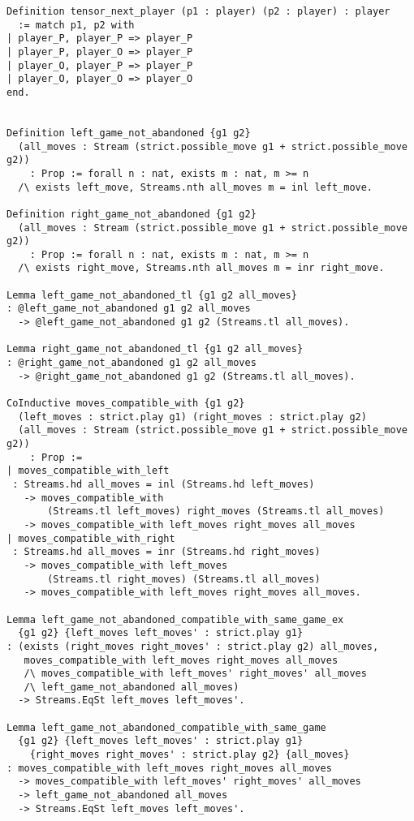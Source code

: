\documentclass{article}
\theoremstyle{definition}
\begin{document}
\begin{verbatim}
Definition tensor_next_player (p1 : player) (p2 : player) : player 
  := match p1, p2 with
| player_P, player_P => player_P
| player_P, player_O => player_P
| player_O, player_P => player_P
| player_O, player_O => player_O
end.

 
Definition left_game_not_abandoned {g1 g2}
  (all_moves : Stream (strict.possible_move g1 + strict.possible_move g2)) 
    : Prop := forall n : nat, exists m : nat, m >= n 
  /\ exists left_move, Streams.nth all_moves m = inl left_move. 

Definition right_game_not_abandoned {g1 g2} 
  (all_moves : Stream (strict.possible_move g1 + strict.possible_move g2)) 
    : Prop := forall n : nat, exists m : nat, m >= n 
  /\ exists right_move, Streams.nth all_moves m = inr right_move. 

Lemma left_game_not_abandoned_tl {g1 g2 all_moves}
: @left_game_not_abandoned g1 g2 all_moves
  -> @left_game_not_abandoned g1 g2 (Streams.tl all_moves).
  
Lemma right_game_not_abandoned_tl {g1 g2 all_moves}
: @right_game_not_abandoned g1 g2 all_moves 
  -> @right_game_not_abandoned g1 g2 (Streams.tl all_moves).

CoInductive moves_compatible_with {g1 g2}
  (left_moves : strict.play g1) (right_moves : strict.play g2) 
  (all_moves : Stream (strict.possible_move g1 + strict.possible_move g2))
    : Prop :=
| moves_compatible_with_left
 : Streams.hd all_moves = inl (Streams.hd left_moves)
   -> moves_compatible_with 
       (Streams.tl left_moves) right_moves (Streams.tl all_moves)
   -> moves_compatible_with left_moves right_moves all_moves
| moves_compatible_with_right
 : Streams.hd all_moves = inr (Streams.hd right_moves)
   -> moves_compatible_with left_moves
       (Streams.tl right_moves) (Streams.tl all_moves)
   -> moves_compatible_with left_moves right_moves all_moves.

Lemma left_game_not_abandoned_compatible_with_same_game_ex
  {g1 g2} {left_moves left_moves' : strict.play g1}
: (exists (right_moves right_moves' : strict.play g2) all_moves,
   moves_compatible_with left_moves right_moves all_moves
   /\ moves_compatible_with left_moves' right_moves' all_moves
   /\ left_game_not_abandoned all_moves)
  -> Streams.EqSt left_moves left_moves'.
  
Lemma left_game_not_abandoned_compatible_with_same_game
  {g1 g2} {left_moves left_moves' : strict.play g1} 
    {right_moves right_moves' : strict.play g2} {all_moves}
: moves_compatible_with left_moves right_moves all_moves
  -> moves_compatible_with left_moves' right_moves' all_moves
  -> left_game_not_abandoned all_moves
  -> Streams.EqSt left_moves left_moves'.
  

\end{verbatim}
\end{document}
